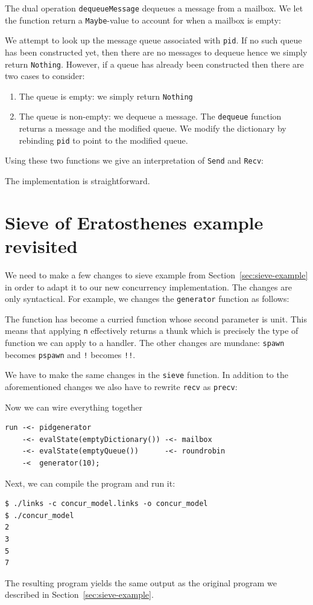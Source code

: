 \documentclass[12pt,mscres,cdtppar,twoside,openright,logo,rightchapter,normalheadings]{infthesis}
\newcommand{\snippet}[1]{}
\theoremstyle{definition}
\begin{document}
The dual operation \lstinline$dequeueMessage$ dequeues a message from
a mailbox. We let the function return a \lstinline$Maybe$-value to
account for when a mailbox is empty:
%
\snippet{dequeueMessage.links}
%
We attempt to look up the message queue associated with
\lstinline$pid$. If no such queue has been constructed yet, then there
are no messages to dequeue hence we simply return
\lstinline$Nothing$. However, if a queue has already been constructed
then there are two cases to consider:
\begin{enumerate}
  \item The queue is empty: we simply return \lstinline$Nothing$
  \item The queue is non-empty: we dequeue a message. The
    \lstinline$dequeue$ function returns a message and the modified
    queue. We modify the dictionary by rebinding \lstinline$pid$ to
    point to the modified queue.
\end{enumerate}

Using these two functions we give an interpretation of
\lstinline$Send$ and \lstinline$Recv$:
%

%
The implementation is straightforward.

\section{Sieve of Eratosthenes example revisited}
\label{sec:links-model-handlers-example}

We need to make a few changes to sieve example from
Section~\ref{sec:sieve-example} in order to adapt it to our new
concurrency implementation. The changes are only syntactical. For
example, we changes the \lstinline$generator$ function as follows:
%

%
The function has become a curried function whose second parameter is
unit. This means that applying \lstinline$n$ effectively returns a
thunk which is precisely the type of function we can apply to a
handler. The other changes are mundane: \lstinline$spawn$ becomes
\lstinline$pspawn$ and \lstinline$!$ becomes \lstinline$!!$.

We have to make the same changes in the \lstinline$sieve$ function. In
addition to the aforementioned changes we also have to rewrite
\lstinline$recv$ as \lstinline$precv$:
%

%
Now we can wire everything together
%
\begin{lstlisting}
run -<- pidgenerator
    -<- evalState(emptyDictionary()) -<- mailbox 
    -<- evalState(emptyQueue())      -<- roundrobin 
    -<  generator(10);
\end{lstlisting}
Next, we can compile the program and run it:
\begin{lstlisting}
$ ./links -c concur_model.links -o concur_model
$ ./concur_model
2
3
5
7
\end{lstlisting}
The resulting program yields the same output as the original program
we described in Section~\ref{sec:sieve-example}.
\end{document}

